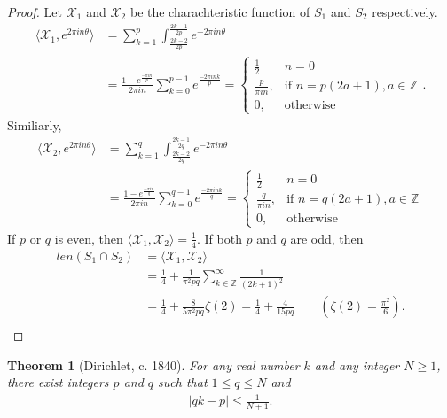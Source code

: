 \documentclass[a4paper,10pt]{amsart}
\newtheorem{theorem}{Theorem}[section]
\newcommand{\X}{\mathcal X}
\newcommand{\Z}{\mathbb Z} %
\begin{document}
\begin{proof}
    Let $\X_{1}$ and $\X_{2}$ be the charachteristic function of $S_1$
    and $S_2$ respectively.
    \begin{align*}
        \langle \X_1, e^{2\pi in \theta}\rangle &= 
        \sum_{k=1}^{p}
        \int_{\frac{2k-2}{2p}}^{\frac{2k-1}{2p}} e^{-2\pi in \theta}\\
        &=\frac{1-e^{\frac{-\pi in}{p}}}{2\pi in}
        \sum_{k=0}^{p-1}e^{\frac{-2\pi ink}{p}} 
        = \begin{cases}
             \frac{1}{2} & n = 0\\
             \frac{p}{\pi i n}, & \mbox{if } n = p(2a + 1), a \in \Z \\
             0, & \mbox{otherwise}
          \end{cases}.
    \end{align*}
    Similiarly,
    \begin{align*}
        \langle \X_2, e^{2\pi in \theta}\rangle &= 
        \sum_{k=1}^{q}
        \int_{\frac{2k-2}{2q}}^{\frac{2k-1}{2q}} e^{-2\pi in \theta}\\
        &=\frac{1-e^{\frac{-\pi in}{q}}}{2\pi in}
        \sum_{k=0}^{q-1}e^{\frac{-2\pi ink}{q}} 
        = \begin{cases}
             \frac{1}{2} & n = 0\\
              \frac{q}{\pi i n}, & \mbox{if } n=q(2a + 1), a \in \Z  \\
              0, & \mbox{otherwise} 
          \end{cases}
    \end{align*}
    If $p$ or $q$ is even, then $\langle \X_1, \X_2 \rangle = \frac{1}{4}$.
    If both $p$ and $q$ are odd, then
    \begin{align*}
        len(S_1 \cap S_2)&=\langle \X_1, \X_2 \rangle \\
        &= \frac{1}{4} + \frac{1}{\pi^2 pq}
        \sum_{k \in \Z }^{\infty}\frac{1}{(2k+1)^2}\\ 
        &= \frac{1}{4} + \frac{8}{5\pi^2 pq}\zeta(2)
         = \frac{1}{4} + \frac{4}{15pq}
        \qquad (\zeta(2) = \frac{\pi^2}{6}).\\
    \end{align*} 
\end{proof}

\begin{theorem}[Dirichlet, c. 1840]
   For any real number $k$ and any integer $N \geq 1$, there exist
   integers $p$ and $q$ such that $1 \leq q \leq N$ and 
   \begin{align*}
       |qk - p| \leq \frac{1}{N+1}. 
   \end{align*}
\end{theorem}
\end{document}
